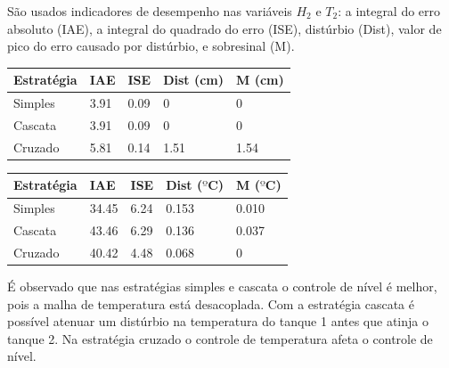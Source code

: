 \documentclass[a0,portrait]{a0poster}
\begin{document}
\begin{multicols}{2}
São usados indicadores de desempenho nas variáveis $H_2$ e $T_2$: a integral do erro absoluto (IAE), a integral do quadrado do erro (ISE), distúrbio (Dist), valor de pico do erro causado por distúrbio, e sobresinal (M).

\begin{center}\vspace{1cm}
\begin{tabular}{l l l l l}
\toprule
\textbf{Estratégia \hspace{0.5cm}} & \textbf{IAE \hspace{0.8cm} } & \textbf{ISE \hspace{0.8cm}} & \textbf{Dist (cm) \hspace{0.4cm}} & \textbf{M (cm) } \\
\midrule
Simples & 3.91 & 0.09 & 0 & 0 \\
Cascata & 3.91 & 0.09 & 0 & 0 \\
Cruzado & 5.81 & 0.14 & 1.51 & 1.54 \\
\bottomrule
\end{tabular}
\end{center}\vspace{1cm} 

\begin{center}
\begin{tabular}{l l l l l}
\toprule
\textbf{Estratégia \hspace{0.5cm}} & \textbf{IAE \hspace{0.8cm} } & \textbf{ISE \hspace{0.8cm}} & \textbf{Dist ($º$C) \hspace{0.4cm}} & \textbf{M ($º$C) } \\
\midrule
Simples & 34.45 & 6.24 & 0.153 & 0.010 \\
Cascata & 43.46 & 6.29 & 0.136 & 0.037  \\
Cruzado & 40.42 & 4.48 & 0.068 & 0  \\
\bottomrule
\end{tabular}
\end{center}\vspace{1cm} 


É observado que nas estratégias simples e cascata o controle de nível é melhor, pois a malha de temperatura está desacoplada. Com a estratégia cascata é possível atenuar um distúrbio na temperatura do tanque 1 antes que atinja o tanque 2. Na estratégia cruzado o controle de temperatura afeta o controle de nível.



\end{multicols}
\end{document}
